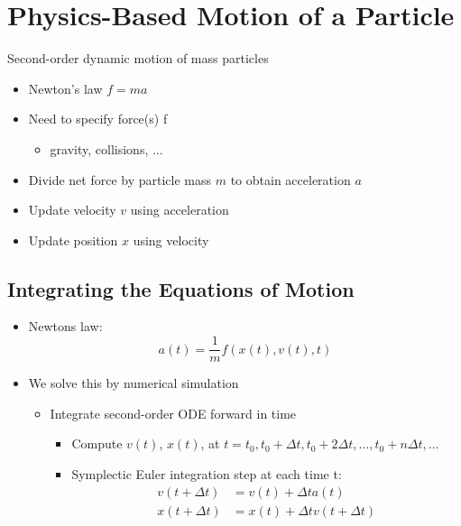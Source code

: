 \documentclass{article}
\begin{document}
\section*{Physics-Based Motion of a Particle}
Second-order dynamic motion of mass particles
\begin{itemize}
    \item Newton's law $f = ma$
    \item Need to specify force(s) f
    \begin{itemize}
        \item gravity, collisions, ...
    \end{itemize}
    \item Divide net force by particle mass $m$ to obtain acceleration $a$
    \item Update velocity $v$ using acceleration
    \item Update position $x$ using velocity
\end{itemize}

\subsection*{Integrating the Equations of Motion}
\begin{itemize}
    \item Newtons law:
    \[a(t) = \frac{1}{m} f(x(t), v(t), t)\]
    \item We solve this by numerical simulation
    \begin{itemize}
        \item Integrate second-order ODE forward in time
        \begin{itemize}
            \item Compute $v(t)$, $x(t)$, at $t = t_0, t_0 + \Delta t, t_0 + 2\Delta t, \dots, t_0 + n\Delta t, \dots$
            \item Symplectic Euler integration step at each time t:
            \begin{align*}
            v(t + \Delta t) &= v(t) + \Delta t a(t)\\
            x(t + \Delta t) &= x(t) + \Delta t v(t + \Delta t)
            \end{align*}
        \end{itemize}
    \end{itemize}
\end{itemize}
\end{document}
